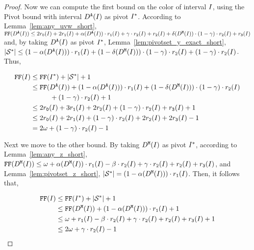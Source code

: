 {\begin{proof}
    Now we can compute the first bound on the color of interval $I$, using the Pivot bound with interval $D^\texttt{A}(I)$ as pivot $I^*$.
    According to Lemma~\ref{lem:any_uvw_short}, $\text{\texttt{FF}}(D^\texttt{A}(I)) \leq  2r_\texttt{0}(I) + 2r_\texttt{1}(I) + \alpha(D^\texttt{A}(I)) \cdot r_\texttt{1}(I) + \gamma  \cdot r_\texttt{2}(I) + r_\texttt{2}(I) + \delta(D^\texttt{M}(I)) \cdot (1 - \gamma ) \cdot r_\texttt{2}(I) + r_\texttt{3}(I)$ and, by taking $D^\texttt{A}(I)$ as pivot $I^*$,  Lemma~\ref{lem:pivotset_y_exact_short}, $|\mathcal{S}^*| \leq (1 - \alpha(D^\texttt{A}(I))) \cdot r_\texttt{1}(I) + (1 - \delta(D^\texttt{M}(I))) \cdot (1 - \gamma ) \cdot r_\texttt{2}(I) + (1 - \gamma ) \cdot r_\texttt{2}(I)$.
    Thus,

    \begin{align*}
        \text{\texttt{FF}}(I) &\leq \text{\texttt{FF}}(I^*) + |\mathcal{S}^*| + 1\\
        &\leq \text{\texttt{FF}}(D^\texttt{A}(I)) + (1 - \alpha(D^\texttt{A}(I))) \cdot r_\texttt{1}(I) + (1 - \delta(D^\texttt{M}(I))) \cdot (1 - \gamma ) \cdot r_\texttt{2}(I) \\ &\hspace{1cm} + (1 - \gamma ) \cdot r_\texttt{2}(I) + 1 \\
        &\leq 2r_\texttt{0}(I) + 3r_\texttt{1}(I) + 2r_\texttt{2}(I) + (1 - \gamma ) \cdot r_\texttt{2}(I) + r_\texttt{3}(I) + 1 \\
        &\leq 2r_\texttt{0}(I) + 2r_\texttt{1}(I) + (1 - \gamma ) \cdot r_\texttt{2}(I) + 2r_\texttt{2}(I) + 2r_\texttt{3}(I) - 1\\
        &= 2\omega + (1 - \gamma ) \cdot r_\texttt{2}(I) - 1
    \end{align*}

    Next we move to the other bound.
    By taking $D^\texttt{M}(I)$ as pivot $I^*$, according to Lemma~\ref{lem:any_z_short}, $\text{\texttt{FF}}(D^\texttt{M}(I)) \leq \omega + \alpha(D^\texttt{M}(I)) \cdot r_\texttt{1}(I) - \beta  \cdot r_\texttt{2}(I) + \gamma  \cdot r_\texttt{2}(I) + r_\texttt{2}(I) + r_\texttt{3}(I)$, and Lemma~\ref{lem:pivotset_z_short}, $|\mathcal{S}^*| = (1 - \alpha(D^\texttt{M}(I)))\cdot r_\texttt{1}(I)$.
    Then, it follows that,

    \begin{align*}
        \ffc(\x) &\leq \ffc(\pivot) + |\pivotset| + 1\\
        &\leq \ffc(\z) + (1 - \alp(\z)) \cdot \nrows{1}{\x} + 1 \\
        &\leq \omega + \nrows{1}{\x} - \bet  \cdot \nrows{2}{\x} + \gam  \cdot \nrows{2}{\x} + \nrows{2}{\x} + \nrows{3}{\x} + 1\\ 
        &\leq 2\omega + \gam  \cdot \nrows{2}{\x} - 1 %
    \end{align*}


\end{proof}}
